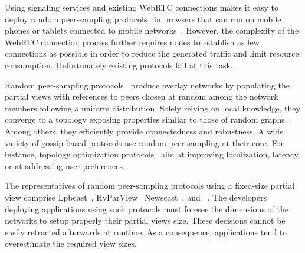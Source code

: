 
Using signaling services and existing WebRTC connections makes it easy
to deploy random peer-sampling protocols~\cite{jelasity2004peer} in
browsers that can run on mobile phones or tablets connected to mobile
networks~\cite{Carvajal-Gómez2015}. However, the complexity of the
WebRTC connection process further requires nodes to establish as few
connections as possible in order to reduce the generated traffic and
limit resource consumption. Unfortunately existing protocols fail at
this task.

Random peer-sampling protocols~\cite{jelasity2004peer,jelasity2007gossip}
produce overlay networks by populating the partial views with references to
peers chosen at random among the network members following a uniform
distribution. Solely relying on local knowledge, they converge to a topology
exposing properties similar to those of random
graphs~\cite{bonnet2006brief,erdos1959random}. Among others, they efficiently
provide connectedness and robustness. A wide variety of gossip-based protocols
use random peer-sampling at their core. For instance, topology optimization
protocols~\cite{jelasity2009tman,voulgaris2005epidemic} aim at improving
localization, latency, or at addressing user preferences.

The representatives of random peer-sampling protocols using a
fixed-size partial view comprise
Lpbcast~\cite{eugster2003lightweight},
HyParView~\cite{leitao2007hyparview}
Newscast~\cite{tolgyeski2009adaptive}, and
\CYCLON~\cite{voulgaris2005cyclon}. The developers deploying
applications using such protocols must foresee the dimensions of the
networks to setup properly their partial views size. These decisions
cannot be easily retracted afterwards at runtime. As a consequence,
applications tend to overestimate the required view sizes.

